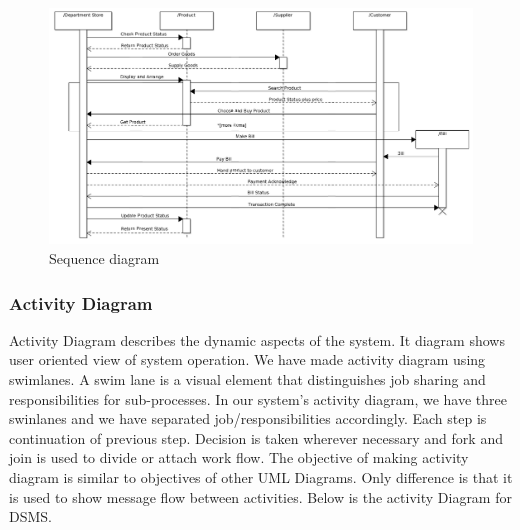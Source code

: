 \begin{figure}[h]\centering
  \includegraphics[width=\textwidth]{fig/sequence}
  \caption{Sequence diagram}\label{fig:sequence}
\end{figure}

\subsubsection{Activity Diagram}

Activity Diagram describes the dynamic aspects of the system. It diagram shows
user oriented view of system operation. We have made activity diagram using
swimlanes. A swim lane is a visual element that distinguishes job sharing and
responsibilities for sub-processes. In our system's activity diagram, we have
three swinlanes and we have separated job/responsibilities accordingly. Each
step is continuation of previous step. Decision is taken wherever necessary and
fork and join is used to divide or attach work flow. The objective of making
activity diagram is similar to objectives of other UML Diagrams. Only
difference is that it is used to show message flow between activities. Below is
the activity Diagram for DSMS. 

